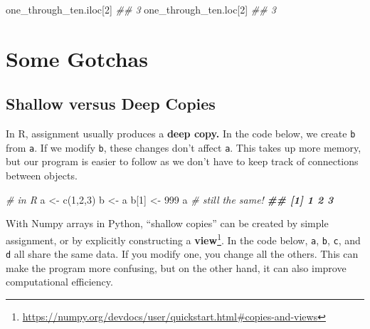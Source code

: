 \documentclass[
  12pt,
]{krantz}
\makeatletter
\newenvironment{Shaded}{\begin{snugshade}}{\end{snugshade}}
\newcommand{\CommentTok}[1]{\textcolor[rgb]{0.37,0.37,0.37}{\textit{#1}}}
\newcommand{\DecValTok}[1]{\textcolor[rgb]{0.06,0.06,0.06}{#1}}
\newcommand{\DocumentationTok}[1]{\textcolor[rgb]{0.37,0.37,0.37}{\textbf{\textit{#1}}}}
\newcommand{\FunctionTok}[1]{\textcolor[rgb]{0,0,0}{#1}}
\newcommand{\NormalTok}[1]{#1}
\newcommand{\OtherTok}[1]{\textcolor[rgb]{0.37,0.37,0.37}{#1}}
\renewcommand{\href}[2]{#2\footnote{\url{#1}}}
\newenvironment{kframe}{%
\medskip{}
\setlength{\fboxsep}{.8em}
 \def\at@end@of@kframe{}%
 \ifinner\ifhmode%
  \def\at@end@of@kframe{\end{minipage}}%
  \begin{minipage}{\columnwidth}%
 \fi\fi%
 \def\FrameCommand##1{\hskip\@totalleftmargin \hskip-\fboxsep
 \colorbox{shadecolor}{##1}\hskip-\fboxsep
     \hskip-\linewidth \hskip-\@totalleftmargin \hskip\columnwidth}%
 \MakeFramed {\advance\hsize-\width
   \@totalleftmargin\z@ \linewidth\hsize
   \@setminipage}}%
 {\par\unskip\endMakeFramed%
 \at@end@of@kframe}
\renewenvironment{Shaded}{\begin{kframe}}{\end{kframe}}
\makeatother
\begin{document}
\begin{Shaded}
\begin{Highlighting}[]
\NormalTok{one\_through\_ten.iloc[}\DecValTok{2}\NormalTok{]}
\CommentTok{\#\# 3}
\NormalTok{one\_through\_ten.loc[}\DecValTok{2}\NormalTok{]}
\CommentTok{\#\# 3}
\end{Highlighting}
\end{Shaded}

\hypertarget{some-gotchas}{%
\section{Some Gotchas}\label{some-gotchas}}

\hypertarget{shallow-versus-deep-copies}{%
\subsection{Shallow versus Deep Copies}\label{shallow-versus-deep-copies}}

In R, assignment usually produces a \textbf{deep copy.} In the code below, we create \texttt{b} from \texttt{a}. If we modify \texttt{b}, these changes don't affect \texttt{a}. This takes up more memory, but our program is easier to follow as we don't have to keep track of connections between objects.

\begin{Shaded}
\begin{Highlighting}[]
\CommentTok{\# in R}
\NormalTok{a }\OtherTok{\textless{}{-}} \FunctionTok{c}\NormalTok{(}\DecValTok{1}\NormalTok{,}\DecValTok{2}\NormalTok{,}\DecValTok{3}\NormalTok{)}
\NormalTok{b }\OtherTok{\textless{}{-}}\NormalTok{ a}
\NormalTok{b[}\DecValTok{1}\NormalTok{] }\OtherTok{\textless{}{-}} \DecValTok{999}
\NormalTok{a }\CommentTok{\# still the same!}
\DocumentationTok{\#\# [1] 1 2 3}
\end{Highlighting}
\end{Shaded}

With Numpy arrays in Python, \href{https://numpy.org/devdocs/user/quickstart.html\#copies-and-views}{``shallow copies'' can be created by simple assignment, or by explicitly constructing a \textbf{view}}. In the code below, \texttt{a}, \texttt{b}, \texttt{c}, and \texttt{d} all share the same data. If you modify one, you change all the others. This can make the program more confusing, but on the other hand, it can also improve computational efficiency.
\end{document}
